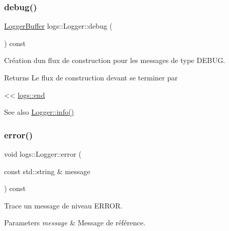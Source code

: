 \subsubsection{\texorpdfstring{debug()}{debug()}\hspace{0.1cm}{\footnotesize\ttfamily [2/2]}}
{\footnotesize\ttfamily \hyperlink{classlogs_1_1Logger_1_1LoggerBuffer}{Logger\+Buffer} logs\+::\+Logger\+::debug (\begin{DoxyParamCaption}{ }\end{DoxyParamCaption}) const\hspace{0.3cm}{\ttfamily [inline]}}



Création d\textquotesingle{}un flux de construction pour les messages de type D\+E\+B\+UG. 

\begin{DoxyReturn}{Returns}
Le flux de construction devant se terminer par
\begin{DoxyCode}
<< \hyperlink{Logger_8hpp_ac6f325c6cfe6189bc8e243daa184453b}{logs::end} 
\end{DoxyCode}
 
\end{DoxyReturn}
\begin{DoxySeeAlso}{See also}
\hyperlink{classlogs_1_1Logger_aa381165771d00a6a1e3aa9664bf6467f}{Logger\+::info()} 
\end{DoxySeeAlso}
\mbox{\label{classlogs_1_1Logger_a8b6a2019233bc44b3c3c86c653910831}} 
\subsubsection{\texorpdfstring{error()}{error()}\hspace{0.1cm}{\footnotesize\ttfamily [1/2]}}
{\footnotesize\ttfamily void logs\+::\+Logger\+::error (\begin{DoxyParamCaption}\item[{const std\+::string \&}]{message }\end{DoxyParamCaption}) const\hspace{0.3cm}{\ttfamily [inline]}}



Trace un message de niveau E\+R\+R\+OR. 


\begin{DoxyParams}{Parameters}
{\em message} & Message de référence. \\
\hline
\end{DoxyParams}
\mbox{\label{classlogs_1_1Logger_ac1468dbd9ac30bc400dafc0c6f69f971}} 
